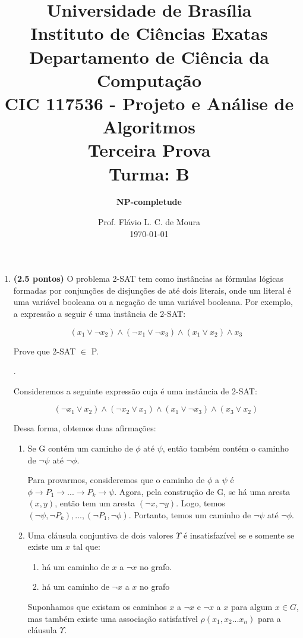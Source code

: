 \documentclass[12pt]{article}
\title{{\large Universidade de Brasília \\ Instituto de Ciências Exatas \\
Departamento de Ciência da Computação} \\[1cm]
CIC 117536 - Projeto e Análise de Algoritmos \\[.5cm]  Terceira Prova \\[.5cm] Turma: B}
\author{{\bf NP-completude}}
\date{Prof. Flávio L. C. de Moura \\[.5cm] \today}
\newcommand{\resposta}[1]{ \noindent {\bf Solução}.{\color{blue} #1}}
\begin{document}
\maketitle

\begin{enumerate}
\item {\bf (2.5 pontos)} O problema 2-SAT tem como instâncias as
  fórmulas lógicas formadas por conjunções de disjunções de até dois
  literais, onde um literal é uma variável booleana ou a negação de
  uma variável booleana. Por exemplo, a expressão a seguir é uma
  instância de 2-SAT:

  $$(x_1\lor \neg x_2)\land (\neg x_1 \lor \neg x_3) \land (x_1 \lor x_2) \land x_3$$

  Prove que 2-SAT $\in$ P.

 
  \resposta{
    Consideremos a seguinte expressão cuja é uma instância de 2-SAT:
    
    $$(\neg x_1 \lor x_2) \land (\neg x_2 \lor x_3) \land (x_1 \lor \neg x_3) \land (x_3 \lor x_2)$$
    
    Dessa forma, obtemos duas afirmações:
    
    \begin{enumerate}
        \item Se G contém um caminho de $\phi$ até $\psi$, então também contém o caminho de $\neg \psi$ até $\neg \phi$.
        
        Para provarmos, consideremos que o caminho de $\phi$ a $\psi$ é $\phi \rightarrow P_1 \rightarrow ... \rightarrow P_k \rightarrow \psi$. Agora, pela construção de G, se há uma aresta $(x, y)$, então tem um aresta $(\neg x, \neg y)$. Logo, temos $(\neg \psi, \neg P_k), ..., (\neg P_1, \neg \phi)$. Portanto, temos um caminho de $\neg \psi$ até $\neg \phi$.
        
        \item Uma cláusula conjuntiva de dois valores $\Upsilon$ é insatisfazível se e somente se existe um $x$ tal que:
        
        \begin{enumerate}
            \item há um caminho de $x$ a $\neg x$ no grafo.
            \item há um caminho de $\neg x$ a $x$ no grafo
        \end{enumerate}
        
        Suponhamos que existam os caminhos $x$ a $\neg x$ e $\neg x$ a $x$ para algum $x \in G$, mas também existe uma associação satisfatível $\rho(x_1,x_2...x_n)$ para a cláusula $\Upsilon$.
        

\end{enumerate}}
\end{enumerate}
\end{document}
